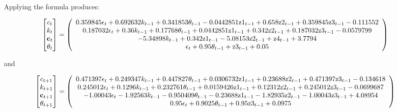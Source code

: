 \documentclass[12pt]{article}
\begin{document}
Applying the formula  produces:

{\tiny
\begin{gather*}
  \begin{bmatrix}
c_t\\k_t\\ \rcpC_t\\\theta_t
  \end{bmatrix}=%
   \left(
   \begin{array}{c}
 0.359845 \epsilon _t+0.692632 k_{t-1}+0.341853 \theta _{t-1}-0.0442851
   \text{z1}_{t-1}+0.658 \text{z2}_{t-1}+0.359845 \text{z3}_{t-1}-0.111552 \\
 0.187032 \epsilon _t+0.36 k_{t-1}+0.17768 \theta _{t-1}+0.0442851
   \text{z1}_{t-1}+0.342 \text{z2}_{t-1}+0.187032 \text{z3}_{t-1}-0.0579799 \\
 -5.34898 k_{t-1}+0.342 \text{z1}_{t-1}-5.08153
   \text{z2}_{t-1}+\text{z4}_{t-1}+3.7794 \\
 \epsilon _t+0.95 \theta _{t-1}+\text{z3}_{t-1}+0.05 \\
   \end{array}
   \right)
\end{gather*}
}

and 


{\tiny
\begin{gather*}
  \begin{bmatrix}
c_{t+1}\\k_{t+1}\\ \rcpC_{t+1}\\\theta_{t+1}
  \end{bmatrix}=%
  \left(
   \begin{array}{c}
 0.471397 \epsilon _t+0.249347 k_{t-1}+0.447827 \theta _{t-1}+0.0306732
   \text{z1}_{t-1}+0.23688 \text{z2}_{t-1}+0.471397 \text{z3}_{t-1}-0.134618 \\
 0.245012 \epsilon _t+0.1296 k_{t-1}+0.232761 \theta _{t-1}+0.0159426
   \text{z1}_{t-1}+0.12312 \text{z2}_{t-1}+0.245012 \text{z3}_{t-1}-0.0699687 \\
 -1.00043 \epsilon _t-1.92563 k_{t-1}-0.950409 \theta _{t-1}-0.23688
   \text{z1}_{t-1}-1.82935 \text{z2}_{t-1}-1.00043 \text{z3}_{t-1}+4.08954 \\
 0.95 \epsilon _t+0.9025 \theta _{t-1}+0.95 \text{z3}_{t-1}+0.0975 \\
   \end{array}
   \right)
\end{gather*}}
\end{document}
